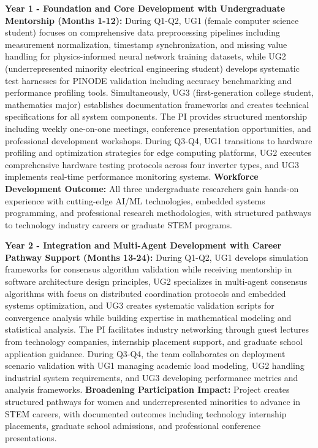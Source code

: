 \documentclass[12pt]{article}
\begin{document}
\textbf{Year 1 - Foundation and Core Development with Undergraduate Mentorship (Months 1-12):} During Q1-Q2, UG1 (female computer science student) focuses on comprehensive data preprocessing pipelines including measurement normalization, timestamp synchronization, and missing value handling for physics-informed neural network training datasets, while UG2 (underrepresented minority electrical engineering student) develops systematic test harnesses for PINODE validation including accuracy benchmarking and performance profiling tools. Simultaneously, UG3 (first-generation college student, mathematics major) establishes documentation frameworks and creates technical specifications for all system components. The PI provides structured mentorship including weekly one-on-one meetings, conference presentation opportunities, and professional development workshops. During Q3-Q4, UG1 transitions to hardware profiling and optimization strategies for edge computing platforms, UG2 executes comprehensive hardware testing protocols across four inverter types, and UG3 implements real-time performance monitoring systems. \textbf{Workforce Development Outcome:} All three undergraduate researchers gain hands-on experience with cutting-edge AI/ML technologies, embedded systems programming, and professional research methodologies, with structured pathways to technology industry careers or graduate STEM programs.

\textbf{Year 2 - Integration and Multi-Agent Development with Career Pathway Support (Months 13-24):} During Q1-Q2, UG1 develops simulation frameworks for consensus algorithm validation while receiving mentorship in software architecture design principles, UG2 specializes in multi-agent consensus algorithms with focus on distributed coordination protocols and embedded systems optimization, and UG3 creates systematic validation scripts for convergence analysis while building expertise in mathematical modeling and statistical analysis. The PI facilitates industry networking through guest lectures from technology companies, internship placement support, and graduate school application guidance. During Q3-Q4, the team collaborates on deployment scenario validation with UG1 managing academic load modeling, UG2 handling industrial system requirements, and UG3 developing performance metrics and analysis frameworks. \textbf{Broadening Participation Impact:} Project creates structured pathways for women and underrepresented minorities to advance in STEM careers, with documented outcomes including technology internship placements, graduate school admissions, and professional conference presentations.
\end{document}
